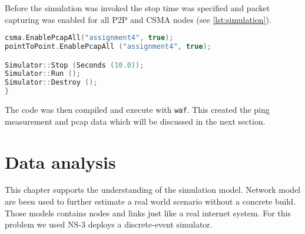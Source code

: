 \documentclass[parskip=full]{scrartcl}
\begin{document}
Before the simulation was invoked the stop time was specified and packet capturing was enabled for all P2P and CSMA nodes (see \cref{lst:simulation}).

\begin{lstlisting}[language=c++, frame=single , captionpos=b, caption={pcap and simulation start}, label=lst:simulation]
csma.EnablePcapAll("assignment4", true);
pointToPoint.EnablePcapAll ("assignment4", true);

Simulator::Stop (Seconds (10.0));
Simulator::Run ();
Simulator::Destroy ();
}
\end{lstlisting}

The code was then compiled and execute with \verb|waf|. This created the ping measurement and pcap data which will be discussed in the next section. 

\section{Data analysis} \label{sec:data}

% 


This chapter supports the understanding of the simulation model. Network model are been used to further estimate a real world scenario without a concrete build. Those models contains nodes and links just like a real internet system. For this problem we used NS-3 deploys a discrete-event simulator.
\end{document}
